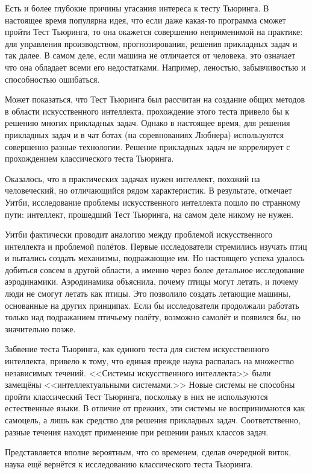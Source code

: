 \documentclass[a4paper,14pt]{scrartcl}
\begin{document}
Есть и более глубокие причины угасания интереса к тесту Тьюринга. В настоящее время популярна идея, что если даже какая-то программа сможет пройти Тест Тьюринга, то она окажется совершенно неприменимой на практике: для управления производством, прогнозирования, решения прикладных задач и так далее. В самом деле, если машина не отличается от человека, это означает что она обладает всеми его недостатками. Например, леностью, забывчивостью и способностью ошибаться. 

Может показаться, что Тест Тьюринга был рассчитан на создание общих методов в области искусственного интеллекта, прохождение этого теста привело бы к решению многих прикладных задач. Однако в настоящее время, для решения прикладных задач и в чат ботах (на соревнованиях Любнера) используются совершенно разные технологии. Решение прикладных задач не коррелирует с прохождением классического теста Тьюринга. 

Оказалось, что в практических задачах нужен интеллект, похожий на человеческий, но отличающийся рядом характеристик. В результате, отмечает Уитби, исследование проблемы искусственного интеллекта пошло по странному пути: интеллект, прошедший Тест Тьюринга, на самом деле никому не нужен.

Уитби фактически проводит аналогию между проблемой искусственного интеллекта и проблемой полётов. Первые исследователи стремились изучать птиц и пытались создать механизмы, подражающие им. Но настоящего успеха удалось добиться совсем в другой области, а именно через более детальное исследование аэродинамики. Аэродинамика объяснила, почему птицы могут летать, и почему люди не смогут летать как птицы. Это позволило создать летающие машины, основанные на других принципах. Если бы исследователи продолжали работать только над подражанием птичьему полёту, возможно самолёт и появился бы, но значительно позже.

Забвение теста Тьюринга, как единого теста для систем искусственного интеллекта, привело к тому, что единая прежде наука распалась на множество независимых течений. <<Системы искусственного интеллекта>> были замещёны <<интеллектуальными системами.>> Новые системы не способны пройти классический Тест Тьюринга, поскольку в них не используются естественные языки. В отличие от прежних, эти системы не воспринимаются как самоцель, а лишь как средство для решения прикладных задач. Соответственно, разные течения находят применение при решении раных классов задач.

Представляется вполне вероятным, что со временем, сделав очередной виток, наука ещё вернётся к исследованию классического теста Тьюринга.
\end{document}
